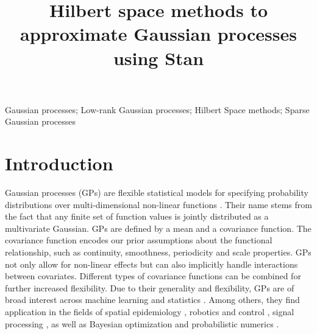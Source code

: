 \documentclass[]{interact}
\theoremstyle{plain}%
\theoremstyle{definition}
\theoremstyle{remark}
\begin{document}

\title{Hilbert space methods to approximate Gaussian processes using Stan}


\maketitle

\begin{abstract}

\end{abstract}

\begin{keywords}
Gaussian processes; Low-rank Gaussian processes; Hilbert Space methods; Sparse Gaussian processes
\end{keywords}

\tableofcontents


\newpage

\section{Introduction}\label{sec:bf_intro}

Gaussian processes (GPs) are flexible statistical models for specifying probability distributions over multi-dimensional non-linear functions \citep{rasmussen2006gaussian,neal1997monte}. Their name stems from the fact that any finite set of function values is jointly distributed as a multivariate Gaussian. GPs are defined by a mean and a covariance function. The covariance function encodes our prior assumptions about the functional relationship, such as continuity, smoothness, periodicity and scale properties. GPs not only allow for non-linear effects but can also implicitly handle interactions between covariates. Different types of covariance functions can be combined for further increased flexibility. Due to their generality and flexibility, GPs are of broad interest across machine learning and statistics \citep{rasmussen2006gaussian,neal1997monte}. Among others, they find application in the fields of spatial epidemiology \citep{diggle2013statistical,carlin2014hierarchical}, robotics and control \citep{deisenroth2015gaussian}, signal processing \citep{sarkka2013spatiotemporal}, as well as Bayesian optimization and probabilistic numerics \citep{roberts2010bayesian,briol2015probabilistic,hennig2015probabilistic}.
\end{document}
